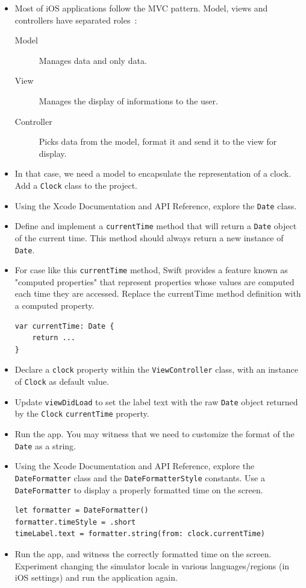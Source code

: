 \documentclass[a4paper,11pt]{scrartcl}
\begin{document}
\begin{itemize}
\item Most of iOS applications follow the MVC pattern. Model, views and controllers have separated roles :
\begin{description}
\item[Model] Manages data and only data.
\item[View] Manages the display of informations to the user.
\item[Controller] Picks data from the model, format it and send it to the view for display.
\end{description}
\item In that case, we need a model to encapsulate the representation of a clock. Add a \texttt{Clock} class to the project.
\item Using the Xcode Documentation and API Reference, explore the \texttt{Date} class.
\item Define and implement a \texttt{currentTime} method that will return a \texttt{Date} object of the current time. This method should always return a new instance of \texttt{Date}.
\item For case like this \texttt{currentTime} method, Swift provides a feature known as "computed properties" that represent properties whose values are computed each time they are accessed. Replace the currentTime method definition with a computed property.
\begin{lstlisting}
var currentTime: Date {
	return ...
}
\end{lstlisting}
\item Declare a \texttt{clock} property within the \texttt{ViewController} class, with an instance of \texttt{Clock} as default value.
\item Update \texttt{viewDidLoad} to set the label text with the raw \texttt{Date} object returned by the \texttt{Clock} \texttt{currentTime} property.
\item Run the app. You may witness that we need to customize the format of the \texttt{Date} as a string.
\item Using the Xcode Documentation and API Reference, explore the \texttt{DateFormatter} class and the \texttt{DateFormatterStyle} constants. Use a \texttt{DateFormatter} to display a properly formatted time on the screen.
\begin{lstlisting}
let formatter = DateFormatter()
formatter.timeStyle = .short
timeLabel.text = formatter.string(from: clock.currentTime)
\end{lstlisting}
\item Run the app, and witness the correctly formatted time on the screen. Experiment changing the simulator locale in various languages/regions (in iOS settings) and run the application again.
\end{itemize}
\end{document}

